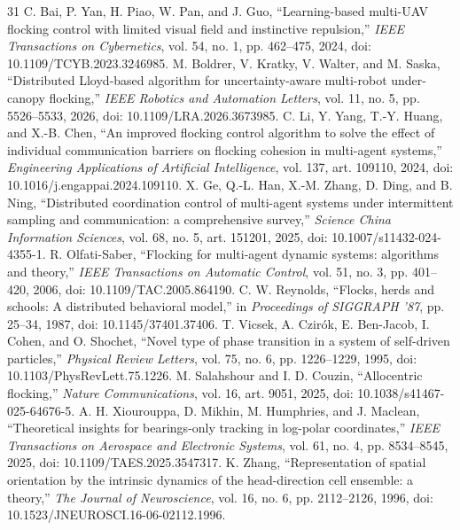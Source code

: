 \documentclass[UTF8,fontset=windows,11pt]{ctexart}
\begin{document}
\begin{thebibliography}{31}
 C. Bai, P. Yan, H. Piao, W. Pan, and J. Guo, ``Learning-based multi-UAV flocking control with limited visual field and instinctive repulsion,'' \emph{IEEE Transactions on Cybernetics}, vol. 54, no. 1, pp. 462--475, 2024, doi: 10.1109/TCYB.2023.3246985.
 M. Boldrer, V. Kratky, V. Walter, and M. Saska, ``Distributed Lloyd-based algorithm for uncertainty-aware multi-robot under-canopy flocking,'' \emph{IEEE Robotics and Automation Letters}, vol. 11, no. 5, pp. 5526--5533, 2026, doi: 10.1109/LRA.2026.3673985.
 C. Li, Y. Yang, T.-Y. Huang, and X.-B. Chen, ``An improved flocking control algorithm to solve the effect of individual communication barriers on flocking cohesion in multi-agent systems,'' \emph{Engineering Applications of Artificial Intelligence}, vol. 137, art. 109110, 2024, doi: 10.1016/j.engappai.2024.109110.
 X. Ge, Q.-L. Han, X.-M. Zhang, D. Ding, and B. Ning, ``Distributed coordination control of multi-agent systems under intermittent sampling and communication: a comprehensive survey,'' \emph{Science China Information Sciences}, vol. 68, no. 5, art. 151201, 2025, doi: 10.1007/s11432-024-4355-1.
 R. Olfati-Saber, ``Flocking for multi-agent dynamic systems: algorithms and theory,'' \emph{IEEE Transactions on Automatic Control}, vol. 51, no. 3, pp. 401--420, 2006, doi: 10.1109/TAC.2005.864190.
 C. W. Reynolds, ``Flocks, herds and schools: A distributed behavioral model,'' in \emph{Proceedings of SIGGRAPH '87}, pp. 25--34, 1987, doi: 10.1145/37401.37406.
 T. Vicsek, A. Czirók, E. Ben-Jacob, I. Cohen, and O. Shochet, ``Novel type of phase transition in a system of self-driven particles,'' \emph{Physical Review Letters}, vol. 75, no. 6, pp. 1226--1229, 1995, doi: 10.1103/PhysRevLett.75.1226.
 M. Salahshour and I. D. Couzin, ``Allocentric flocking,'' \emph{Nature Communications}, vol. 16, art. 9051, 2025, doi: 10.1038/s41467-025-64676-5.
 A. H. Xiourouppa, D. Mikhin, M. Humphries, and J. Maclean, ``Theoretical insights for bearings-only tracking in log-polar coordinates,'' \emph{IEEE Transactions on Aerospace and Electronic Systems}, vol. 61, no. 4, pp. 8534--8545, 2025, doi: 10.1109/TAES.2025.3547317.
 K. Zhang, ``Representation of spatial orientation by the intrinsic dynamics of the head-direction cell ensemble: a theory,'' \emph{The Journal of Neuroscience}, vol. 16, no. 6, pp. 2112--2126, 1996, doi: 10.1523/JNEUROSCI.16-06-02112.1996.

\end{thebibliography}
\end{document}
